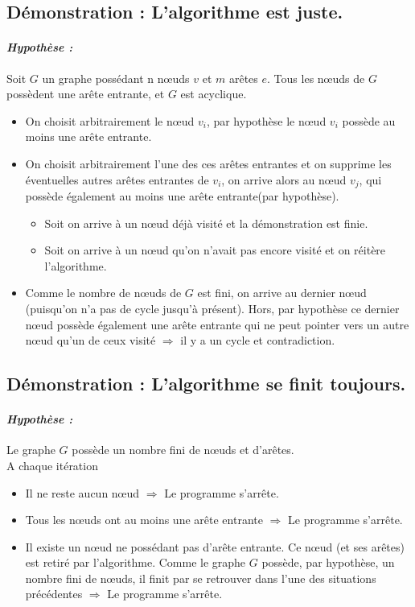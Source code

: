 \subsection*{Démonstration : L'algorithme est juste.}
\paragraph{\textit{Hypothèse :}}Soit $G$ un graphe possédant n nœuds $v$ et $m$ arêtes $e$.
Tous les nœuds de $G$ possèdent une arête entrante, et $G$ est acyclique.\\

\begin{itemize}
\item On choisit arbitrairement le nœud $v_i$, par hypothèse le nœud $v_i$ possède au moins une arête entrante. 
\item On choisit arbitrairement l'une des ces arêtes entrantes et on supprime les éventuelles autres arêtes entrantes de $v_i$, on arrive alors au nœud $v_j$, qui possède également au moins une arête entrante(par hypothèse).
\begin{itemize}
\item Soit on arrive à un nœud déjà visité et la démonstration est finie.
\item Soit on arrive à un nœud qu'on n'avait pas encore visité et on réitère l'algorithme.
\end{itemize}
\item Comme le nombre de nœuds de $G$ est fini, on arrive au dernier nœud (puisqu'on n'a pas de cycle jusqu'à présent). Hors, par hypothèse ce dernier nœud possède également une arête entrante qui ne peut pointer vers un autre nœud qu'un de ceux visité $\Rightarrow$ il y a un cycle et contradiction.

\end{itemize}




\subsection*{Démonstration : L'algorithme se finit toujours.}
\paragraph{\textit{Hypothèse :}}Le graphe $G$ possède un nombre fini de nœuds et d'arêtes.\\

A chaque itération 
\begin{itemize}
\item Il ne reste aucun nœud $\Rightarrow$ Le programme s'arrête.
\item Tous les nœuds ont au moins une arête entrante $\Rightarrow$ Le programme s'arrête.
\item Il existe un nœud ne possédant pas d'arête entrante. Ce nœud (et ses arêtes) est retiré par l'algorithme. Comme le graphe $G$ possède, par hypothèse, un nombre fini de nœuds, il finit par se retrouver dans l'une des situations précédentes $\Rightarrow$ Le programme s'arrête.
\end{itemize} 
